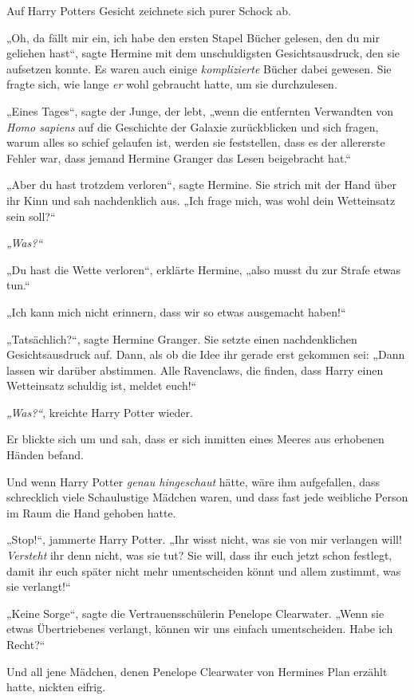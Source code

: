 Auf Harry Potters Gesicht zeichnete sich purer Schock ab. 

„Oh, da fällt mir ein, ich habe den ersten Stapel Bücher gelesen, den du mir geliehen hast“, sagte Hermine mit dem unschuldigsten Gesichtsausdruck, den sie aufsetzen konnte. Es waren auch einige \emph{komplizierte} Bücher dabei gewesen. Sie fragte sich, wie lange \emph{er} wohl gebraucht hatte, um sie durchzulesen. 

„Eines Tages“, sagte der Junge, der lebt, „wenn die entfernten Verwandten von \emph{Homo sapiens} auf die Geschichte der Galaxie zurückblicken und sich fragen, warum alles so schief gelaufen ist, werden sie feststellen, dass es der allererste Fehler war, dass jemand Hermine Granger das Lesen beigebracht hat.“ 

„Aber du hast trotzdem verloren“, sagte Hermine. Sie strich mit der Hand über ihr Kinn und sah nachdenklich aus. „Ich frage mich, was wohl dein Wetteinsatz sein soll?“ 

\emph{„Was?“} 

„Du hast die Wette verloren“, erklärte Hermine, „also musst du zur Strafe etwas tun.“ 

„Ich kann mich nicht erinnern, dass wir so etwas ausgemacht haben!“ 

„Tatsächlich?“, sagte Hermine Granger. Sie setzte einen nachdenklichen Gesichtsausdruck auf. Dann, als ob die Idee ihr gerade erst gekommen sei: „Dann lassen wir darüber abstimmen. Alle Ravenclaws, die finden, dass Harry einen Wetteinsatz schuldig ist, meldet euch!“ 

\emph{„Was?“}, kreichte Harry Potter wieder. 

Er blickte sich um und sah, dass er sich inmitten eines Meeres aus erhobenen Händen befand. 

Und wenn Harry Potter \emph{genau hingeschaut} hätte, wäre ihm aufgefallen, dass schrecklich viele Schaulustige Mädchen waren, und dass fast jede weibliche Person im Raum die Hand gehoben hatte. 

„Stop!“, jammerte Harry Potter. „Ihr wisst nicht, was sie von mir verlangen will! \emph{Versteht} ihr denn nicht, was sie tut? Sie will, dass ihr euch jetzt schon festlegt, damit ihr euch später nicht mehr umentscheiden könnt und allem zustimmt, was sie verlangt!“ 

„Keine Sorge“, sagte die Vertrauensschülerin Penelope Clearwater. „Wenn sie etwas Übertriebenes verlangt, können wir uns einfach umentscheiden. Habe ich Recht?“ 

Und all jene Mädchen, denen Penelope Clearwater von Hermines Plan erzählt hatte, nickten eifrig. 

